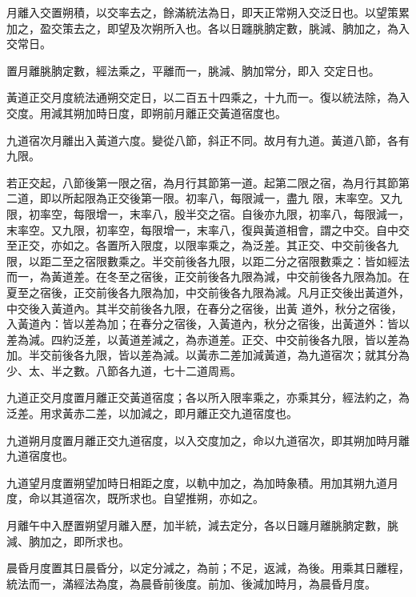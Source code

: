 \begin{pinyinscope}
 月離入交置朔積，以交率去之，餘滿統法為日，即天正常朔入交泛日也。以望策累加之，盈交策去之，即望及次朔所入也。各以日躔朓朒定數，朓減、朒加之，為入交常日。



 置月離朓朒定數，經法乘之，平離而一，朓減、朒加常分，即入
 交定日也。



 黃道正交月度統法通朔交定日，以二百五十四乘之，十九而一。復以統法除，為入交度。用減其朔加時日度，即朔前月離正交黃道宿度也。



 九道宿次月離出入黃道六度。變從八節，斜正不同。故月有九道。黃道八節，各有九限。



 若正交起，八節後第一限之宿，為月行其節第一道。起第二限之宿，為月行其節第二道，即以所起限為正交後第一限。初率八，每限減一，盡九
 限，末率空。又九限，初率空，每限增一，末率八，殷半交之宿。自後亦九限，初率八，每限減一，末率空。又九限，初率空，每限增一，末率八，復與黃道相會，謂之中交。自中交至正交，亦如之。各置所入限度，以限率乘之，為泛差。其正交、中交前後各九限，以距二至之宿限數乘之。半交前後各九限，以距二分之宿限數乘之：皆如經法而一，為黃道差。在冬至之宿後，正交前後各九限為減，中交前後各九限為加。在夏至之宿後，正交前後各九限為加，中交前後各九限為減。凡月正交後出黃道外，中交後入黃道內。其半交前後各九限，在春分之宿後，出黃
 道外，秋分之宿後，入黃道內：皆以差為加；在春分之宿後，入黃道內，秋分之宿後，出黃道外：皆以差為減。四約泛差，以黃道差減之，為赤道差。正交、中交前後各九限，皆以差為加。半交前後各九限，皆以差為減。以黃赤二差加減黃道，為九道宿次；就其分為少、太、半之數。八節各九道，七十二道周焉。



 九道正交月度置月離正交黃道宿度；各以所入限率乘之，亦乘其分，經法約之，為泛差。用求黃赤二差，以加減之，即月離正交九道宿度也。



 九道朔月度置月離正交九道宿度，以入交度加之，命以九道宿次，即其朔加時月離九道宿度也。



 九道望月度置朔望加時日相距之度，以軌中加之，為加時象積。用加其朔九道月度，命以其道宿次，既所求也。自望推朔，亦如之。



 月離午中入歷置朔望月離入歷，加半統，減去定分，各以日躔月離朓朒定數，朓減、朒加之，即所求也。



 晨昏月度置其日晨昏分，以定分減之，為前；不足，返減，為後。用乘其日離程，統法而一，滿經法為度，為晨昏前後度。前加、後減加時月，為晨昏月度。




\end{pinyinscope}
